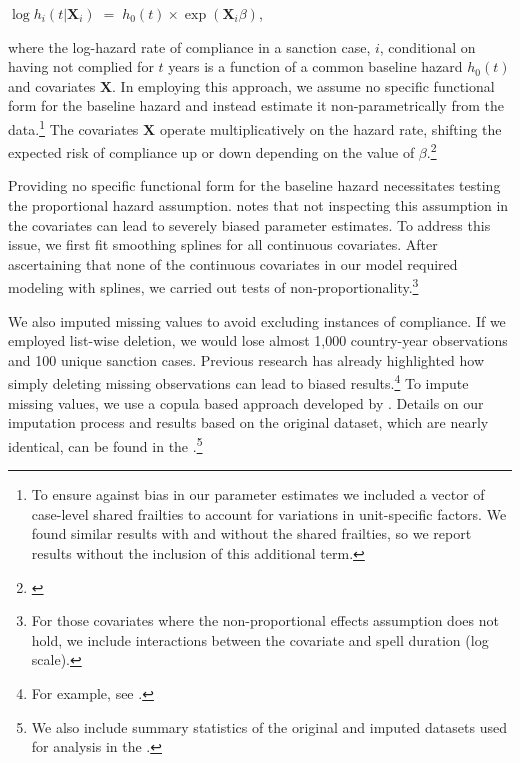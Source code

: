 \begin{center}
	$\log h_{i}(t | \boldsymbol{X}_{i}) \; = \; h_{0}(t) \times \exp(\boldsymbol{X}_{i} \beta)$,
\end{center}

where the log-hazard rate of compliance in a sanction case, $i$, conditional on having not complied for $t$ years is a function of a common baseline hazard $h_{0}(t)$ and covariates $\boldsymbol{X}$. In employing this approach, we assume no specific functional form for the baseline hazard and instead estimate it non-parametrically from the data.\footnote{To ensure against bias in our parameter estimates we included a vector of case-level shared frailties to account for variations in unit-specific factors. We found similar results with and without the shared frailties, so we report results without the inclusion of this additional term.}  The covariates $\boldsymbol{X}$ operate multiplicatively on the hazard rate, shifting the expected risk of compliance up or down depending on the value of $\beta$.\footnote{\cite{crespo2013political}}

Providing no specific functional form for the baseline hazard necessitates testing the proportional hazard assumption. \citet{keele2010proportionally} notes that not inspecting this assumption in the covariates can lead to severely biased parameter estimates. To address this issue, we first fit smoothing splines for all continuous covariates. After ascertaining that none of the continuous covariates in our model required modeling with splines, we carried out tests of non-proportionality.\footnote{For those covariates where the non-proportional effects assumption does not hold, we include interactions between the covariate and spell duration (log scale).} 

We also imputed missing values to avoid excluding instances of compliance. If we employed list-wise deletion, we would lose almost 1,000 country-year observations and 100 unique sanction cases. Previous research has already highlighted how simply deleting missing observations can lead to biased results.\footnote{For example, see \citealp{rubin1976inference,honaker2010missing}.} To impute missing values, we use a copula based approach developed by \citet{hoff:2007}. Details on our imputation process and results based on the original dataset, which are nearly identical, can be found in the .\footnote{We also include summary statistics of the original and imputed datasets used for analysis in the . } 

